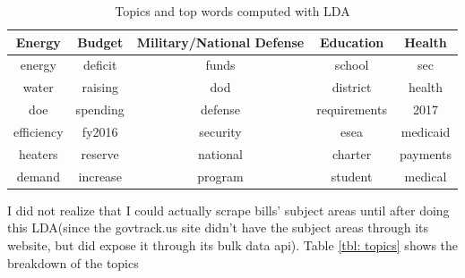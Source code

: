 \documentclass{article}
\begin{document}
\begin{table}[]
\centering
\vspace{-10pt}
\caption{\label{tbl: lda}Topics and top words computed with LDA}
\begin{tabular}{c c c c c}
\hline
Energy      & Budget    & Military/National Defense & Education & Health \\
\hline
energy      & deficit   & funds                     & school           & sec \\
water       & raising   & dod                       & district         & health \\
doe         & spending  & defense                   & requirements     & 2017 \\
efficiency  & fy2016    & security                  & esea             & medicaid \\
heaters     & reserve   & national                  & charter          & payments \\
demand      & increase  & program                   & student          & medical  \\
\hline
\end{tabular}
\end{table}
I did not realize that I could actually scrape bills' subject areas until after doing this LDA(since the govtrack.us site didn't have the subject areas through its website, but did expose it through its bulk data api). Table \ref{tbl: topics} shows the breakdown of the topics
\end{document}
